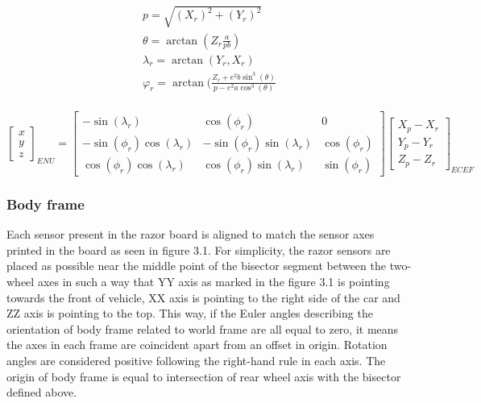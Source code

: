 \begin{equation}
  \begin{gathered}
    p = \sqrt{(X_r)^2 + (Y_r)^2} \\
    \theta = \arctan(Z_r\frac{a}{pb} ) \\
    \lambda_r = \arctan(Y_r,X_r) \\
    \varphi_r = \arctan(\frac{Z_r + e^2 b\sin^3(\theta)}{p - e^2 a \cos^3(\theta )}  \\
  \end{gathered}
  \label{eq:transformation}
\end{equation}

\begin{equation}
  \begin{bmatrix}
    x \\
    y \\
    z
  \end{bmatrix}_{ENU}
  =
  \begin{bmatrix}
    -\sin(\lambda_r)             & \cos( \phi_r)                 & 0            \\
    -\sin(\phi_r)\cos(\lambda_r) & -\sin( \phi_r)\sin(\lambda_r) & \cos(\phi_r) \\
    \cos(\phi_r)\cos(\lambda_r)  & \cos(\phi_r) \sin(\lambda_r)  & \sin(\phi_r)
  \end{bmatrix}
  \begin{bmatrix}
    X_p - X_r \\
    Y_p - Y_r \\
    Z_p - Z_r
  \end{bmatrix}_{ECEF}
  \label{eq:transformation_results}
\end{equation}

\subsubsection{Body frame}

Each sensor present in the razor board is aligned to match the sensor axes printed in the board as seen in figure 3.1. For simplicity, the razor sensors are placed as possible near the middle point of the bisector segment between the two-wheel axes in such a way that YY axis as marked in the figure 3.1 is pointing towards the front of vehicle, XX axis is pointing to the right side of the car and ZZ axis is pointing to the top. This way, if the Euler angles describing the orientation of body frame related to world frame are all equal to zero, it means the axes in each frame are coincident apart from an offset in origin. Rotation angles are considered positive following the right-hand rule in each axis. The origin of body frame is equal to intersection of rear wheel axis with the bisector defined above.

